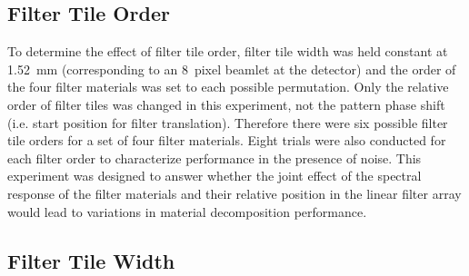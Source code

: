 \documentclass[12pt]{spieman}  %
\begin{document}
\begin{spacing}{1}
\FloatBarrier



\vspace{-4mm}

\subsection{Filter Tile Order}

\vspace{-2mm}

To determine the effect of filter tile order, filter tile width was held constant at 1.52~mm (corresponding to an 8~pixel beamlet at the detector) and the order of the four filter materials was set to each possible permutation. Only the relative order of filter tiles was changed in this experiment, not the pattern phase shift (i.e. start position for filter translation). Therefore there were six possible filter tile orders for a set of four filter materials. Eight trials were also conducted for each filter order to characterize performance in the presence of noise. This experiment was designed to answer whether the joint effect of the spectral response of the filter materials and their relative position in the linear filter array would lead to variations in material decomposition performance.

\vspace{-2mm}

\subsection{Filter Tile Width}


\end{spacing}
\end{document}
